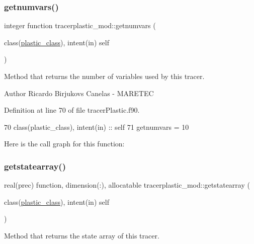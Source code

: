 \subsubsection{\texorpdfstring{getnumvars()}{getnumvars()}}
{\footnotesize\ttfamily integer function tracerplastic\+\_\+mod\+::getnumvars (\begin{DoxyParamCaption}\item[{class(\mbox{\hyperlink{structtracerplastic__mod_1_1plastic__class}{plastic\+\_\+class}}), intent(in)}]{self }\end{DoxyParamCaption})\hspace{0.3cm}{\ttfamily [private]}}



Method that returns the number of variables used by this tracer. 

\begin{DoxyAuthor}{Author}
Ricardo Birjukovs Canelas -\/ M\+A\+R\+E\+T\+EC 
\end{DoxyAuthor}


Definition at line 70 of file tracer\+Plastic.\+f90.


\begin{DoxyCode}
70     \textcolor{keywordtype}{class}(plastic\_class), \textcolor{keywordtype}{intent(in)} :: self
71     getnumvars = 10
\end{DoxyCode}
Here is the call graph for this function\+:
\mbox{\label{namespacetracerplastic__mod_aa8cdd2196261b216dd6cdd5b7ef2fe90}} 
\subsubsection{\texorpdfstring{getstatearray()}{getstatearray()}}
{\footnotesize\ttfamily real(prec) function, dimension(\+:), allocatable tracerplastic\+\_\+mod\+::getstatearray (\begin{DoxyParamCaption}\item[{class(\mbox{\hyperlink{structtracerplastic__mod_1_1plastic__class}{plastic\+\_\+class}}), intent(in)}]{self }\end{DoxyParamCaption})\hspace{0.3cm}{\ttfamily [private]}}



Method that returns the state array of this tracer. 

